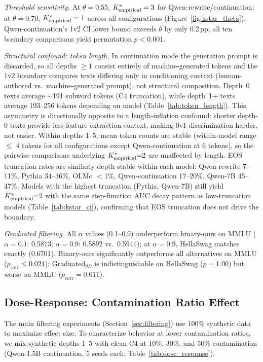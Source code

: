 \emph{Threshold sensitivity.}
At $\theta = 0.55$, ${K^*_{\text{empirical}}} = 3$ for Qwen-rewrite/continuation; at $\theta = 0.70$, ${K^*_{\text{empirical}}} = 1$ across all configurations (Figure~\ref{fig:kstar_theta}).
Qwen-continuation's 1v2 CI lower bound exceeds $\theta$ by only 0.2\,pp; all ten boundary comparisons yield permutation $p < 0.001$.

\emph{Structural confound: token length.}
In continuation mode the generation prompt is discarded, so all depths $\geq 1$ consist entirely of machine-generated tokens and the 1v2 boundary compares texts differing only in conditioning context (human-authored vs.\ machine-generated prompt), not structural composition.
Depth~0 texts average ${\sim}$191 subword tokens (C4 truncation), while depth~1+ texts average 193--256 tokens depending on model (Table~\ref{tab:token_length}).
This asymmetry is directionally opposite to a length-inflation confound: shorter depth-0 texts provide less feature-extraction context, making 0v1 discrimination harder, not easier.
Within depths 1--5, mean token counts are stable (within-model range $\leq$ 4 tokens for all configurations except Qwen-continuation at 6 tokens), so the pairwise comparisons underlying ${K^*_{\text{empirical}}}{=}2$ are unaffected by length.
EOS truncation rates are similarly depth-stable within each model: Qwen-rewrite 7--11\%, Pythia 34--36\%, OLMo $<$1\%, Qwen-continuation 17--20\%, Qwen-7B 45--47\%.
Models with the highest truncation (Pythia, Qwen-7B) still yield ${K^*_{\text{empirical}}}{=}2$ with the same step-function AUC decay pattern as low-truncation models (Table~\ref{tab:kstar_ci}), confirming that EOS truncation does not drive the boundary.

\emph{Graduated filtering.}
All $\alpha$ values (0.1--0.9) underperform binary-ours on MMLU ($\alpha{=}0.1$: 0.5873; $\alpha{=}0.9$: 0.5892 vs.\ 0.5941); at $\alpha{=}0.9$, HellaSwag matches exactly (0.6701).
Binary-ours significantly outperforms all alternatives on MMLU ($p_{\text{corr}} \leq 0.021$); Graduated$_{0.9}$ is indistinguishable on HellaSwag ($p = 1.00$) but worse on MMLU ($p_{\text{corr}} = 0.011$).
\label{tab:pairwise_significance}

\subsection{Dose-Response: Contamination Ratio Effect}
\label{sec:dose_response}

The main filtering experiments (Section~\ref{sec:filtering}) use 100\% synthetic data to maximize effect size.
To characterize behavior at lower contamination ratios, we mix synthetic depths 1--5 with clean C4 at 10\%, 30\%, and 50\% contamination (Qwen-1.5B continuation, 5 seeds each; Table~\ref{tab:dose_response}).

